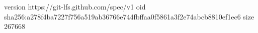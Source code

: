 version https://git-lfs.github.com/spec/v1
oid sha256:a278f4ba7227f756a519ab36766e744fbffaa0f5861a3f2e74abcb8810ef1ec6
size 267668
